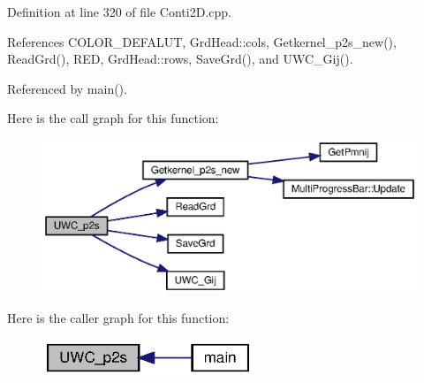 Definition at line 320 of file Conti2\+D.\+cpp.



References C\+O\+L\+O\+R\+\_\+\+D\+E\+F\+A\+L\+UT, Grd\+Head\+::cols, Getkernel\+\_\+p2s\+\_\+new(), Read\+Grd(), R\+ED, Grd\+Head\+::rows, Save\+Grd(), and U\+W\+C\+\_\+\+Gij().



Referenced by main().

Here is the call graph for this function\+:
\nopagebreak
\begin{figure}[H]
\begin{center}
\leavevmode
\includegraphics[width=350pt]{Conti2D_8h_af8adb87017663774bfd342b39facc828_af8adb87017663774bfd342b39facc828_cgraph}
\end{center}
\end{figure}
Here is the caller graph for this function\+:\nopagebreak
\begin{figure}[H]
\begin{center}
\leavevmode
\includegraphics[width=179pt]{Conti2D_8h_af8adb87017663774bfd342b39facc828_af8adb87017663774bfd342b39facc828_icgraph}
\end{center}
\end{figure}
